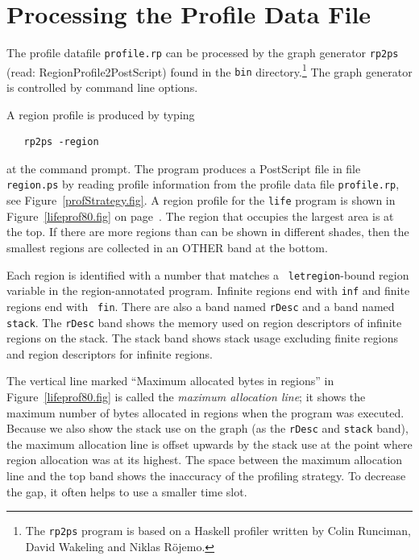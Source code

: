 \documentclass[12pt]{book}
\begin{document}
\section{Processing the Profile Data File}
The profile datafile {\tt profile.rp} can be processed by the 
%
graph generator {\tt rp2ps} (read: RegionProfile2PostScript) found in
the {\tt bin} directory.\footnote{The {\tt rp2ps} program is based on
  a Haskell profiler written by Colin Runciman, David Wakeling and Niklas
  R\"{o}jemo.} The graph generator is controlled by command line
options.

A 
%
%
region profile is produced by typing
\begin{verbatim}
   rp2ps -region
\end{verbatim}
at the command prompt. The program produces a PostScript file in
file {\tt region.ps} by reading profile information from the 
%
profile data file {\tt profile.rp}, see Figure~\ref{profStrategy.fig}.
A region profile for the {\tt life} program is shown in
Figure~\ref{lifeprof80.fig} on page~\pageref{lifeprof80.fig}. The
region that occupies the largest area is at the top. If there are more
regions than can be shown in different shades, then the smallest
regions are collected in an OTHER band at the bottom.

Each region is identified with a number that matches a {\tt
  letregion}-bound region variable in the region-annotated program.
Infinite regions end with {\tt inf} and finite regions end with {\tt
  fin}. There are also a band named {\tt rDesc} and a band named
{\tt stack}. The {\tt rDesc} band shows the memory used on
region descriptors of infinite regions on the stack. The stack band
shows stack usage excluding finite regions and region descriptors for
infinite regions.

The vertical line marked ``Maximum allocated bytes in regions'' in
Figure~\ref{lifeprof80.fig} is called the {\em maximum allocation
  line}; it shows the maximum number of bytes allocated in regions
when the program was executed. Because we also show the stack use on
the graph (as the {\tt rDesc} and {\tt stack} band), the maximum
allocation line is offset upwards by the stack use at the point where
region allocation was at its highest. The space between the maximum
allocation line and the top band shows the inaccuracy of the profiling
strategy. To decrease the gap, it often helps to use a smaller time
slot.
\end{document}
